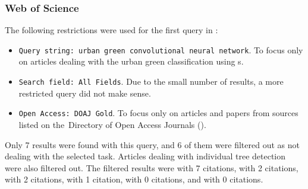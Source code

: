 \subsubsection{Web of Science}
\label{urban-green-wos}

The following restrictions were used for the first query in :

\begin{itemize}
	\item \verb|Query string: urban green convolutional neural network|. To focus only on articles dealing with the urban green classification using s.
	\item \verb|Search field: All Fields|. Due to the small number of results, a more restricted query did not make sense.
	\item \verb|Open Access: DOAJ Gold|. To focus only on articles and papers from sources listed on the~Di\-rectory of Open Access Journals ().
\end{itemize}

\noindent Only 7 results were found with this query, and 6 of them were filtered out as not dealing with the selected task. Articles dealing with individual tree detection were also filtered out. The filtered results were \cite{tree-detection-uav-cnn} with 7 citations, \cite{cascaded-cnn-trees} with 2 citations, \cite{window-zooming-fruit} with 2 citations, \cite{urban-green-quantification} with 1 citation, \cite{urban-green-obesity} with 0 citations, and \cite{urban-green-contamination} with 0 citations.

